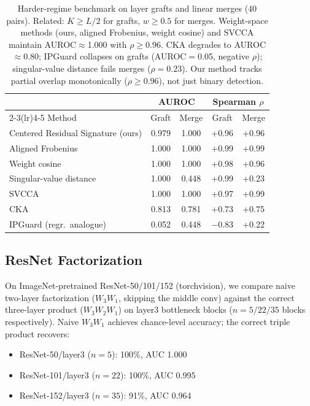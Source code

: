 \begin{table}[h]
\centering\small
\setlength{\tabcolsep}{4pt}
\begin{tabular}{lcccc}
\toprule
& \multicolumn{2}{c}{AUROC} & \multicolumn{2}{c}{Spearman $\rho$} \\
\cmidrule(lr){2-3}\cmidrule(lr){4-5}
Method & Graft & Merge & Graft & Merge \\
\midrule
Centered Residual Signature (ours)  & 0.979 & 1.000 & +0.96 & +0.96 \\
Aligned Frobenius          & 1.000 & 1.000 & +0.99 & +0.99 \\
Weight cosine              & 1.000 & 1.000 & +0.98 & +0.96 \\
Singular-value distance    & 1.000 & 0.448 & +0.99 & +0.23 \\
SVCCA                      & 1.000 & 1.000 & +0.97 & +0.99 \\
CKA                        & 0.813 & 0.781 & +0.73 & +0.75 \\
IPGuard (regr.\ analogue)  & 0.052 & 0.448 & $-$0.83 & +0.22 \\
\bottomrule
\end{tabular}
\caption{Harder-regime benchmark on layer grafts and linear merges ($40$ pairs). Related: $K \ge L/2$ for grafts, $w \ge 0.5$ for merges. Weight-space methods (ours, aligned Frobenius, weight cosine) and SVCCA maintain AUROC${\approx}$1.000 with $\rho \ge 0.96$. CKA degrades to AUROC${\approx}$0.80; IPGuard collapses on grafts (AUROC$=$0.05, negative $\rho$); singular-value distance fails merges ($\rho = 0.23$). Our method tracks partial overlap monotonically ($\rho \ge 0.96$), not just binary detection.}
\label{tab:harder-bench}
\end{table}

\subsection{ResNet Factorization}\label{app:resnet-factorization}

On ImageNet-pretrained ResNet-50/101/152 (torchvision), we compare naive two-layer factorization ($W_3 W_1$, skipping the middle conv) against the correct three-layer product ($W_3 W_2 W_1$) on layer3 bottleneck blocks ($n{=}5/22/35$ blocks respectively). Naive $W_3 W_1$ achieves chance-level accuracy; the correct triple product recovers:
\begin{itemize}[nosep]
\item ResNet-50/layer3 ($n{=}5$): 100\%, AUC 1.000
\item ResNet-101/layer3 ($n{=}22$): 100\%, AUC 0.995
\item ResNet-152/layer3 ($n{=}35$): 91\%, AUC 0.964
\end{itemize}

